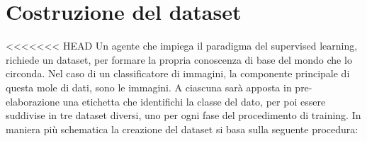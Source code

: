 \documentclass[14pt]{extarticle}
\begin{document}
\section{Costruzione del dataset}
<<<<<<< HEAD
Un agente che impiega il paradigma del supervised learning, richiede un dataset, per formare la propria conoscenza di base del mondo che lo circonda. Nel caso di un classificatore di immagini, la componente principale di questa mole di dati, sono le immagini. A ciascuna sarà apposta in pre-elaborazione una etichetta che identifichi la classe del dato, per poi essere suddivise in tre dataset diversi, uno per ogni fase del procedimento di training.
In maniera più schematica la creazione del dataset si basa sulla seguente procedura:

\end{document}
